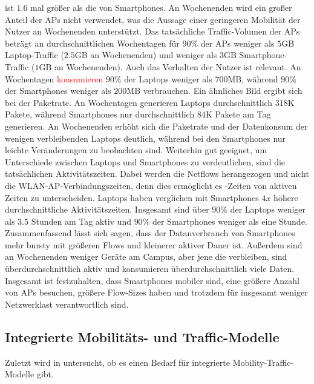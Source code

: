 \documentclass[12pt, a4paper]{article}
\begin{document}
ist $1.6$ mal größer als die von Smartphones. An Wochenenden wird ein großer Anteil der APs nicht verwendet,
was die Aussage einer geringeren Mobilität der Nutzer an Wochenenden unterstützt.
Das tatsächliche Traffic-Volumen der APs beträgt an durchschnittlichen Wochentagen für $90 \%$ der APs
weniger als $5$\textsc{GB} Laptop-Traffic ($2.5$\textsc{GB} an Wochenenden) und weniger als $3$\textsc{GB} Smartphone-Traffic
($1$\textsc{GB} an Wochenenden).
Auch das Verhalten der Nutzer ist relevant. An Wochentagen \textcolor{red}{konsumieren} $90 \%$ der Laptops weniger als $700$\textsc{MB},
während $90 \%$ der Smartphones weniger als $200$\textsc{MB} verbrauchen.
Ein ähnliches Bild ergibt sich bei der Paketrate. An Wochentagen generieren Laptops durchschnittlich $318$\textsc{K} Pakete, 
während Smartphones nur durchschnittlich $84$\textsc{K} Pakete am Tag generieren. 
An Wochenenden erhöht sich die Paketrate und der Datenkonsum der wenigen verbleibenden Laptops deutlich,
während bei den Smartphones nur leichte Veränderungen zu beobachten sind.
Weiterhin gut geeignet, um Unterschiede zwischen Laptops und Smartphones zu verdeutlichen, sind die tatsächlichen Aktivitätszeiten.
Dabei werden die Netflows herangezogen und nicht die WLAN-AP-Verbindungszeiten, denn dies ermöglicht es -Zeiten
von aktiven Zeiten zu unterscheiden. Laptops haben verglichen mit Smartphones $4x$ höhere durchschnittliche Aktivitätszeiten.
Insgesamt sind über $90 \%$ der Laptops weniger als $3.5$ Stunden am Tag aktiv und $90 \%$ der Smartphones weniger als eine Stunde.\newline
Zusammenfassend lässt sich sagen, dass der Datanverbrauch von Smartphones mehr bursty mit größeren Flows und kleinerer aktiver
Dauer ist. Außerdem sind an Wochenenden weniger Geräte am Campus, aber jene die verbleiben, sind überdurchschnittlich aktiv 
und konsumieren überdurchschnittlich viele Daten. Insgesamt ist festzuhalten, dass Smartphones mobiler sind, 
eine größere Anzahl von APs besuchen, größere Flow-Sizes haben und trotzdem für insgesamt weniger Netzwerklast 
verantwortlich sind.

\vfill
\pagebreak

\subsection{Integrierte Mobilitäts- und Traffic-Modelle}

Zuletzt wird in \cite{Alipour2018} untersucht, ob es einen Bedarf für integrierte Mobility-Traffic-Modelle gibt.
\end{document}
